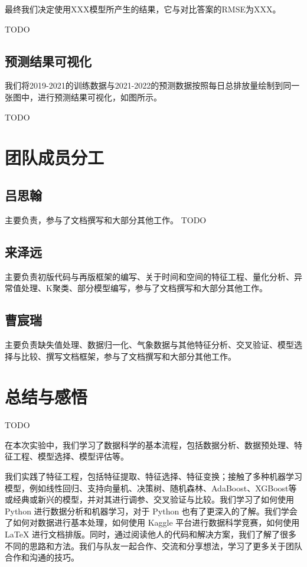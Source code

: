\documentclass{ctexart}
\begin{document}
最终我们决定使用XXX模型所产生的结果，它与对比答案的RMSE为XXX。

TODO

\subsection{预测结果可视化}

我们将2019-2021的训练数据与2021-2022的预测数据按照每日总排放量绘制到同一张图中，进行预测结果可视化，如图所示。

TODO

\section{团队成员分工}

\subsection{吕思翰}

主要负责，参与了文档撰写和大部分其他工作。
TODO

\subsection{来泽远}

主要负责初版代码与再版框架的编写、关于时间和空间的特征工程、量化分析、异常值处理、K聚类、部分模型编写，参与了文档撰写和大部分其他工作。

\subsection{曹宸瑞}

主要负责缺失值处理、数据归一化、气象数据与其他特征分析、交叉验证、模型选择与比较、撰写文档框架，参与了文档撰写和大部分其他工作。

\section{总结与感悟}

TODO

在本次实验中，我们学习了数据科学的基本流程，包括数据分析、数据预处理、特征工程、模型选择、模型评估等。

我们实践了特征工程，包括特征提取、特征选择、特征变换；接触了多种机器学习模型，例如线性回归、支持向量机、决策树、随机森林、AdaBoost、XGBoost等或经典或新兴的模型，并对其进行调参、交叉验证与比较。我们学习了如何使用 Python 进行数据分析和机器学习，对于 Python 也有了更深入的了解。我们学会了如何对数据进行基本处理，如何使用 Kaggle 平台进行数据科学竞赛，如何使用 \LaTeX{} 进行文档排版。同时，通过阅读他人的代码和解决方案，我们了解了很多不同的思路和方法。我们与队友一起合作、交流和分享想法，学习了更多关于团队合作和沟通的技巧。
\end{document}
